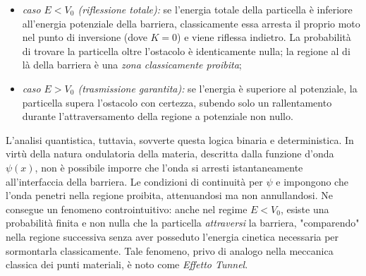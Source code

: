 \documentclass[a4paper,11pt]{report}
\begin{document}
\begin{itemize}
    \item \textit{caso $E < V_0$ (riflessione totale):} se l'energia totale della particella è inferiore all'energia potenziale della barriera, classicamente essa arresta il proprio moto nel punto di inversione (dove $K=0$) e viene riflessa indietro. La probabilità di trovare la particella oltre l'ostacolo è identicamente nulla; la regione al di là della barriera è una \textit{zona classicamente proibita};
    \item \textit{caso $E > V_0$ (trasmissione garantita):} se l'energia è superiore al potenziale, la particella supera l'ostacolo con certezza, subendo solo un rallentamento durante l'attraversamento della regione a potenziale non nullo.
\end{itemize}
L'analisi quantistica, tuttavia, sovverte questa logica binaria e deterministica. In virtù della natura ondulatoria della materia, descritta dalla funzione d'onda $\psi(x)$, non è possibile imporre che l'onda si arresti istantaneamente all'interfaccia della barriera. Le condizioni di continuità per $\psi$ e impongono che l'onda penetri nella regione proibita, attenuandosi ma non annullandosi.
Ne consegue un fenomeno controintuitivo: anche nel regime $E < V_0$, esiste una probabilità finita e non nulla che la particella \textit{attraversi} la barriera, "comparendo" nella regione successiva senza aver posseduto l'energia cinetica necessaria per sormontarla classicamente. Tale fenomeno, privo di analogo nella meccanica classica dei punti materiali, è noto come \textit{Effetto Tunnel}.
\end{document}
